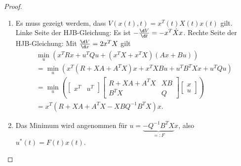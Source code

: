 \begin{proof}
\begin{enumerate}[label=(\alph*)]
  \item Es muss gezeigt werdem, dass $V(x(t),t)=x^T(t)X(t)x(t)$ gilt.\\
  Linke Seite der \ac{HJB}-Gleichung: Es ist $-\frac{\d V}{\d t} = -x^T\dot{X}x$.
  Rechte Seite der \ac{HJB}-Gleichung: Mit $\frac{\d V}{\d x} = 2x^TX$ gilt
  \begin{multline}
  	\min\limits_{u}\left(x^TRx + u^TQu + \left(x^TX + x^TX \right)\left(Ax + Bu \right) \right)\\
  	= \min\limits_{u}\left(x^T\left(R + XA +A^TX \right)x + x^TXBu + u^TB^TXx + u^TQ u
  	\right)\\
  	= \min\limits_{u}\left(\begin{bmatrix}
  	x^T & u^T
  	\end{bmatrix}\begin{bmatrix}
  	R + XA + A^T X & XB\\ B^TX	& Q
  	\end{bmatrix}\begin{bmatrix}
  	x\\ u
  	\end{bmatrix} \right)\\
  	 = x^T\left(R + XA + A^TX - XBQ^{-1}B^TX \right)x. \label{eqn:kap_3_zeitkont_proof}
  \end{multline} 
  \item Das Minimum  wird angenommen für $u = \underbrace{-Q^{-1}B^TX}_{=:F}x$, also $u^{\ast}(t)=F(t)x(t)$.
\end{enumerate}
\end{proof}


